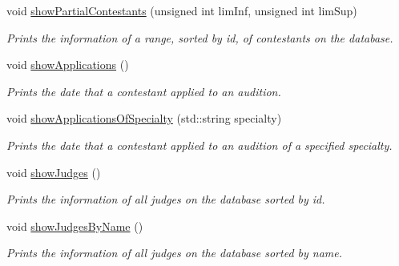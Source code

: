 \begin{DoxyCompactItemize}
void \hyperlink{class_company_m_s_abcf7feaa5979b0b7b2e6214f435e13d5}{show\+Partial\+Contestants} (unsigned int lim\+Inf, unsigned int lim\+Sup)
\begin{DoxyCompactList}\small\item\em Prints the information of a range, sorted by id, of contestants on the database. \end{DoxyCompactList}\item 
\mbox{\label{class_company_m_s_aca0d13073246666630172336f70b9f77}} 
void \hyperlink{class_company_m_s_aca0d13073246666630172336f70b9f77}{show\+Applications} ()
\begin{DoxyCompactList}\small\item\em Prints the date that a contestant applied to an audition. \end{DoxyCompactList}\item 
\mbox{\label{class_company_m_s_a8a1ecf86813a5267a3b362c42eda0277}} 
void \hyperlink{class_company_m_s_a8a1ecf86813a5267a3b362c42eda0277}{show\+Applications\+Of\+Specialty} (std\+::string specialty)
\begin{DoxyCompactList}\small\item\em Prints the date that a contestant applied to an audition of a specified specialty. \end{DoxyCompactList}\item 
\mbox{\label{class_company_m_s_ab99e991065941d7ba095c2df82092903}} 
void \hyperlink{class_company_m_s_ab99e991065941d7ba095c2df82092903}{show\+Judges} ()
\begin{DoxyCompactList}\small\item\em Prints the information of all judges on the database sorted by id. \end{DoxyCompactList}\item 
\mbox{\label{class_company_m_s_a9aa36d7839038615053f050bc7553260}} 
void \hyperlink{class_company_m_s_a9aa36d7839038615053f050bc7553260}{show\+Judges\+By\+Name} ()
\begin{DoxyCompactList}\small\item\em Prints the information of all judges on the database sorted by name. \end{DoxyCompactList}\item 
\mbox{\label{class_company_m_s_a819d7178b4b677d08b83a35c2c835152}} 

\end{DoxyCompactItemize}
